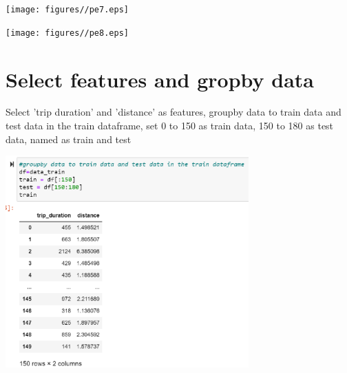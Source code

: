 {
	\vspace{0.5cm} 
	\begin{flushleft}
		\centering
		\texttt{[image: figures//pe7.eps]}\\
	\end{flushleft}
	
	\begin{flushleft}
		\centering
		\selectcolormodel{rgb}
		\texttt{[image: figures//pe8.eps]}\\
	\end{flushleft}
}

\section{Select features and gropby data} 
{
	\begin{description}
		\item
		Select ’trip duration’ and ’distance’ as features, groupby data to train data and test
		data in the train dataframe, set 0 to 150 as train data, 150 to 180 as test data,
		named as train and test
	\end{description}
	\vspace{-0.8cm}
	\begin{flushleft}
		\centering
		\includegraphics[width=0.7\textwidth]{figures//pe13.eps}\\
	\end{flushleft}
	
}


